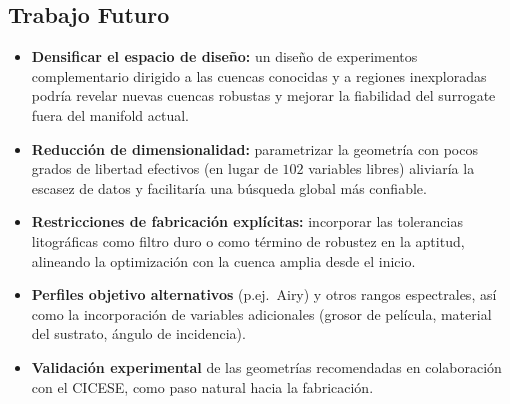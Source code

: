 \subsection{Trabajo Futuro}\label{subsec:trabajo_futuro}

\begin{itemize}
    \item \textbf{Densificar el espacio de diseño:} un diseño de experimentos complementario dirigido a las cuencas conocidas y a regiones inexploradas podría revelar nuevas cuencas robustas y mejorar la fiabilidad del surrogate fuera del manifold actual.

    \item \textbf{Reducción de dimensionalidad:} parametrizar la geometría con pocos grados de libertad efectivos (en lugar de $102$ variables libres) aliviaría la escasez de datos y facilitaría una búsqueda global más confiable.

    \item \textbf{Restricciones de fabricación explícitas:} incorporar las tolerancias litográficas como filtro duro o como término de robustez en la aptitud, alineando la optimización con la cuenca amplia desde el inicio.

    \item \textbf{Perfiles objetivo alternativos} (p.ej.\ Airy) y otros rangos espectrales, así como la incorporación de variables adicionales (grosor de película, material del sustrato, ángulo de incidencia).

    \item \textbf{Validación experimental} de las geometrías recomendadas en colaboración con el CICESE, como paso natural hacia la fabricación.
\end{itemize}

